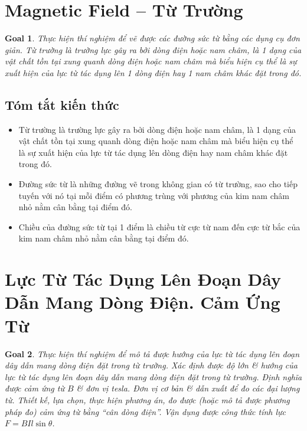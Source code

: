\documentclass{article}
\newtheorem{goal}{Goal}
\begin{document}

\section{Magnetic Field -- Từ Trường}

\begin{goal}
	Thực hiện thí nghiệm để vẽ được các đường sức từ bằng các dụng cụ đơn giản. Từ trường là trường lực gây ra bởi dòng điện hoặc nam châm, là 1 dạng của vật chất tồn tại xung quanh dòng điện hoặc nam châm mà biểu hiện cụ thể là sự xuất hiện của lực từ tác dụng lên 1 dòng điện hay 1 nam châm khác đặt trong đó.
\end{goal}

\subsection{Tóm tắt kiến thức}

\begin{itemize}
	\item Từ trường là trường lực gây ra bởi dòng điện hoặc nam châm, là 1 dạng của vật chất tồn tại xung quanh dòng điện hoặc nam châm mà biểu hiện cụ thể là sự xuất hiện của lực từ tác dụng lên dòng điện hay nam châm khác đặt trong đó.
	\item Đường sức từ là những đường vẽ trong không gian có từ trường, sao cho tiếp tuyến với nó tại mỗi điểm có phương trùng với phương của kim nam châm nhỏ nằm cân bằng tại điểm đó.
	\item Chiều của đường sức từ tại 1 điểm là chiều từ cực từ nam đến cực từ bắc của kim nam châm nhỏ nằm cân bằng tại điểm đó.
\end{itemize}


\section{Lực Từ Tác Dụng Lên Đoạn Dây Dẫn Mang Dòng Điện. Cảm Ứng Từ}

\begin{goal}
	Thực hiện thí nghiệm để mô tả được hướng của lực từ tác dụng lên đoạn dây dẫn mang dòng điện đặt trong từ trường. Xác định được độ lớn \& hướng của lực từ tác dụng lên đoạn dây dẫn mang dòng điện đặt trong từ trường. Định nghĩa được cảm ứng từ $B$ \& đơn vị tesla. Đơn vị cơ bản \& dẫn xuất để đo các đại lượng từ. Thiết kế, lựa chọn, thực hiện phương án, đo được (hoặc mô tả được phương pháp đo) cảm ứng từ bằng ``cân dòng điện''. Vận dụng được công thức tính lực $F = BIl\sin\theta$.
\end{goal}
\end{document}

